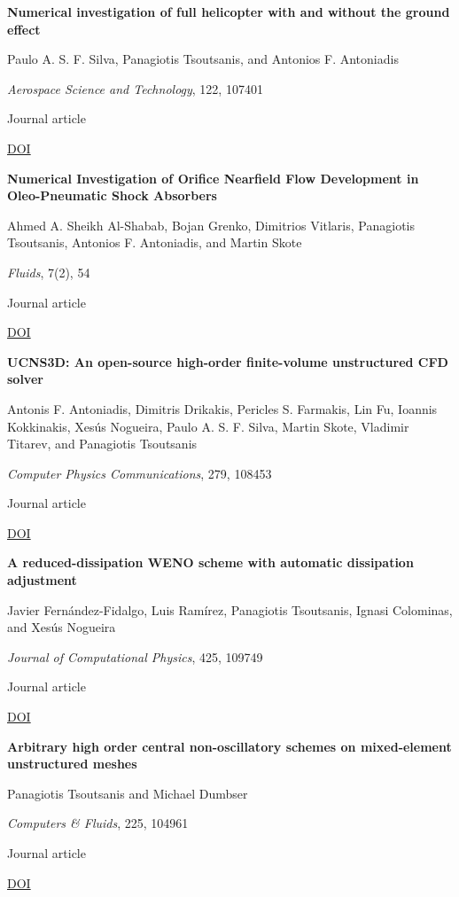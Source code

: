 \documentclass[11pt,a4paper]{article}
\newlength{\cventrysep}
\newenvironment{cventry}{%
  \par\noindent\begin{minipage}{\linewidth}
  \RaggedRight\fontsize{9.8}{12.5}\selectfont
}{\end{minipage}\par\addvspace{\cventrysep}}
\newcommand{\cvtitle}[1]{{\bfseries #1\par}\vspace{1pt}}
\newcommand{\cvdetail}[1]{{#1\par}\vspace{1pt}}
\newcommand{\cvmeta}[1]{{\fontsize{9}{11.5}\selectfont\color{Muted}#1\par}\vspace{1pt}}
\newcommand{\cvlinks}[1]{{\fontsize{9}{11.5}\selectfont #1\par}}
\newcommand{\cvyear}[1]{{\color{Teal}\bfseries\fontsize{11}{13}\selectfont #1\par}\vspace{6pt}}
\begin{document}
\begin{cventry}
\cvtitle{Numerical investigation of full helicopter with and without the ground effect}
\cvdetail{Paulo A. S. F. Silva, Panagiotis Tsoutsanis, and Antonios F. Antoniadis}
\cvmeta{\textit{Aerospace Science and Technology}, 122, 107401\par Journal article}
\cvlinks{\href{https://doi.org/10.1016/j.ast.2022.107401}{DOI}}
\end{cventry}

\begin{cventry}
\cvtitle{Numerical Investigation of Orifice Nearfield Flow Development in Oleo-Pneumatic Shock Absorbers}
\cvdetail{Ahmed A. Sheikh Al-Shabab, Bojan Grenko, Dimitrios Vitlaris, Panagiotis Tsoutsanis, Antonios F. Antoniadis, and Martin Skote}
\cvmeta{\textit{Fluids}, 7(2), 54\par Journal article}
\cvlinks{\href{https://doi.org/10.3390/fluids7020054}{DOI}}
\end{cventry}

\begin{cventry}
\cvtitle{UCNS3D: An open-source high-order finite-volume unstructured CFD solver}
\cvdetail{Antonis F. Antoniadis, Dimitris Drikakis, Pericles S. Farmakis, Lin Fu, Ioannis Kokkinakis, Xesús Nogueira, Paulo A. S. F. Silva, Martin Skote, Vladimir Titarev, and Panagiotis Tsoutsanis}
\cvmeta{\textit{Computer Physics Communications}, 279, 108453\par Journal article}
\cvlinks{\href{https://doi.org/10.1016/j.cpc.2022.108453}{DOI}}
\end{cventry}

\begin{cventry}
\cvyear{2021}
\cvtitle{A reduced-dissipation WENO scheme with automatic dissipation adjustment}
\cvdetail{Javier Fernández-Fidalgo, Luis Ramírez, Panagiotis Tsoutsanis, Ignasi Colominas, and Xesús Nogueira}
\cvmeta{\textit{Journal of Computational Physics}, 425, 109749\par Journal article}
\cvlinks{\href{https://doi.org/10.1016/j.jcp.2020.109749}{DOI}}
\end{cventry}

\begin{cventry}
\cvtitle{Arbitrary high order central non-oscillatory schemes on mixed-element unstructured meshes}
\cvdetail{Panagiotis Tsoutsanis and Michael Dumbser}
\cvmeta{\textit{Computers \& Fluids}, 225, 104961\par Journal article}
\cvlinks{\href{https://doi.org/10.1016/j.compfluid.2021.104961}{DOI}}
\end{cventry}
\end{document}
